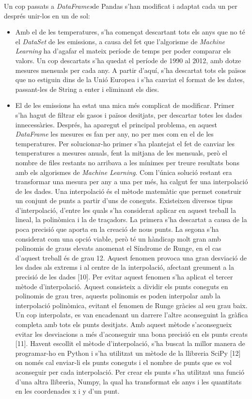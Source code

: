 \documentclass[10pt,a4paper,twocolumn,twoside]{article}
\begin{document}
Un cop passats a \textit{DataFrames}de Pandas s'han modificat i adaptat cada un per després unir-los en un de sol:
\begin{itemize}
\item Amb el de les temperatures, s'ha començat descartant tots els anys que no té el \textit{DataSet} de les emissions, a causa del fet que l'algorisme de \textit{Machine Learning} ha d'agafar el mateix període de temps per poder comparar els valors. Un cop descartats s'ha quedat el període de 1990 al 2012, amb dotze mesures mensuals per cada any. A partir d'aquí, s'ha descartat tots els països que no estiguin dins de la Unió Europea i s'ha canviat el format de les dates, passant-les de String a enter i eliminant els dies.
\item El de les emissions ha estat una mica més complicat de modificar. Primer s'ha hagut de filtrar els gasos i països desitjats, per descartar totes les dades innecessàries. Després, ha aparegut el principal problema, en aquest \textit{DataFrame} les mesures es fan per any, no per mes com en el de les temperatures. Per solucionar-ho primer s'ha plantejat el fet de canviar les temperatures a mesures anuals, fent la mitjana de les mensuals, però el nombre de files restants no arribava a les mínimes per treure resultats bons amb els algorismes de \textit{Machine Learning}. Com l'única solució restant era transformar una mesura per any a una per més, ha calgut fer una interpolació de les dades.
Una interpolació és el mètode matemàtic que permet construir un conjunt de punts a partir d'uns de coneguts. Existeixen diversos tipus d'interpolació, d'entre les quals s'ha considerat aplicar en aquest treball la lineal, la polinòmica i la de traçadors. La primera s'ha descartat a causa de la poca precisió que aporta en la creació de nous punts. La segona s'ha considerat com una opció viable, però té un hàndicap molt gran amb polinomis de graus elevats anomenat el Síndrome de Runge, en el cas d'aquest treball és de grau 12. Aquest fenomen provoca una gran desviació de les dades als extrems i al centre de la interpolació, afectant greument a la precisió de les dades [10]. Per evitar aquest fenomen s'ha aplicat el tercer mètode d'interpolació. Aquest consisteix a dividir els punts coneguts en polinomis de grau tres, aquests polinomis es poden interpolar amb la interpolació polinòmica, evitant el fenomen de Runge gràcies al seu grau baix. Un cop interpolats, es van encadenant un darrere l'altre aconseguint la gràfica completa amb tots els punts desitjats. Amb aquest mètode s'aconsegueix evitar les desviacions a més d'aconseguir una bona precisió en els punts creats [11]. Havent escollit el mètode d'interpolació, s'ha buscat la millor manera de programar-ho en Python i s'ha utilitzat un mètode de la llibreria SciPy [12] on només cal enviar-li els punts coneguts i el nombre de punts que es vol aconseguir per cada interpolació. Per crear els punts s'ha utilitzat una funció d'una altra llibreria, Numpy, la qual ha transformat els anys i les quantitats en les coordenades x i y d'un punt.
\end{itemize}
\end{document}
